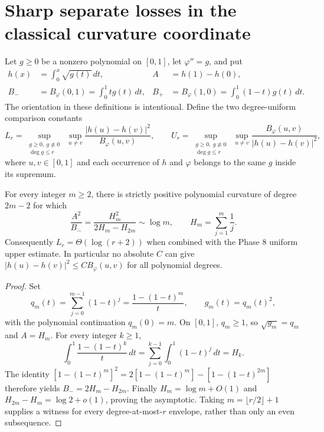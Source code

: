 \section{Sharp separate losses in the classical curvature coordinate}

Let $g\geq0$ be a nonzero polynomial on $[0,1]$, let
$\varphi''=g$, and put
\begin{align*}
 h(x)&=\int_0^x\sqrt{g(t)}\,dt,&
 A&=h(1)-h(0),\\
 B_-&=B_\varphi(0,1)=\int_0^1 t g(t)\,dt,&
 B_+&=B_\varphi(1,0)=\int_0^1(1-t)g(t)\,dt.
\end{align*}
The orientation in these definitions is intentional. Define the two
degree-uniform comparison constants
\[
 L_r=\sup_{\substack{g\geq0,\ g\not\equiv0\\\deg g\leq r}}
       \ \sup_{u\ne v}\frac{|h(u)-h(v)|^2}{B_\varphi(u,v)},
 \qquad
 U_r=\sup_{\substack{g\geq0,\ g\not\equiv0\\\deg g\leq r}}
       \ \sup_{u\ne v}\frac{B_\varphi(u,v)}{|h(u)-h(v)|^2},
\]
where $u,v\in[0,1]$ and each occurrence of $h$ and $\varphi$ belongs to
the same $g$ inside its supremum.

\begin{proposition}
For every integer $m\geq2$, there is strictly positive polynomial curvature
of degree $2m-2$ for which
\[
 \frac{A^2}{B_-}=\frac{H_m^2}{2H_m-H_{2m}}\sim\log m,
 \qquad H_m=\sum_{j=1}^m\frac1j.
\]
Consequently $L_r=\Theta(\log(r+2))$ when combined with the Phase 8
uniform upper estimate. In particular no absolute $C$ can give
$|h(u)-h(v)|^2\leq C B_\varphi(u,v)$ for all polynomial degrees.
\end{proposition}
\begin{proof}
Set
\[
 q_m(t)=\sum_{j=0}^{m-1}(1-t)^j
       =\frac{1-(1-t)^m}{t},\qquad g_m(t)=q_m(t)^2,
\]
with the polynomial continuation $q_m(0)=m$. On $[0,1]$, $q_m\geq1$,
so $\sqrt{g_m}=q_m$ and $A=H_m$. For every integer $k\geq1$,
\[
 \int_0^1\frac{1-(1-t)^k}{t}\,dt
 =\sum_{j=0}^{k-1}\int_0^1(1-t)^j\,dt=H_k.
\]
The identity
$[1-(1-t)^m]^2=2[1-(1-t)^m]-[1-(1-t)^{2m}]$
therefore yields $B_-=2H_m-H_{2m}$. Finally
$H_m=\log m+O(1)$ and $H_{2m}-H_m=\log2+o(1)$, proving the
asymptotic. Taking $m=\lfloor r/2\rfloor+1$ supplies a witness for every
degree-at-most-$r$ envelope, rather than only an even subsequence.
\end{proof}

